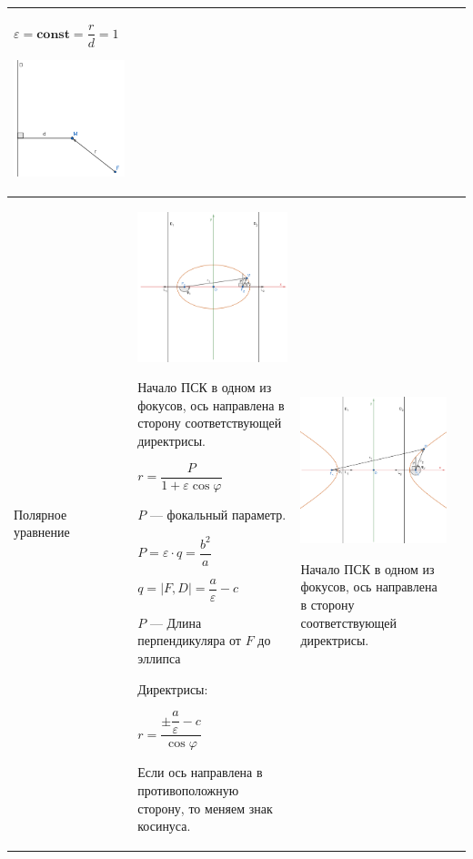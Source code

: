 \documentclass[twoside]{book}
\begin{document}
\begin{center}
\begin{longtable}{|p{2.5cm}|p{4.5cm}|p{4.5cm}|p{4.5cm}|}
        \(\varepsilon = \mathbf{const} = \dfrac{r}{d} = 1\)
        \begin{center}
            \includegraphics[width=4.5cm]{Images/Chapter_1/3-1-2.png}
        \end{center}
        \\
        \hline
        Полярное уравнение
         &
        \begin{center}
            \includegraphics[width=4.5cm]{Images/Chapter_1/3-1-10.png}
        \end{center}
        Начало ПСК в одном из фокусов, ось направлена в сторону соответствующей директрисы.

        \(r = \dfrac{P}{1 + \varepsilon \cos\varphi}\)

        \(P\) --- фокальный параметр.

        \(P = \varepsilon \cdot q = \dfrac{b^2}{a}\)

        \(q = |F, D| = \dfrac{a}{\varepsilon} - c\)

        \(P\) --- Длина перпендикуляра от \(F\) до эллипса

        Директрисы:

        \(r = \dfrac{\pm \dfrac{a}{\varepsilon} - c}{\cos\varphi}\)

        Если ось направлена в противоположную сторону, то меняем знак косинуса.
         &
        \begin{center}
            \includegraphics[width=4.5cm]{Images/Chapter_1/3-1-11.png}
        \end{center}
        Начало ПСК в одном из фокусов, ось направлена в сторону соответствующей директрисы.


\end{longtable}
\end{center}
\end{document}
